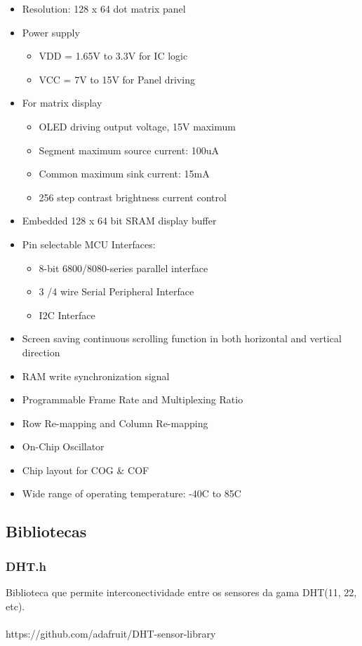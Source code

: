 \documentclass[12pt,a4paper,portrait]{article}
\begin{document}
			\begin{itemize}
				\item Resolution: 128 x 64 dot matrix panel 
				\item Power supply 
				\begin{itemize}
					\item VDD = 1.65V to 3.3V for IC logic
					\item VCC = 7V to 15V for Panel driving 
				\end{itemize}
				\item For matrix display
				\begin{itemize}
					\item OLED driving output voltage, 15V maximum 
					\item Segment maximum source current: 100uA 
					\item Common maximum sink current: 15mA 
					\item 256 step contrast brightness current control 
				\end{itemize}
				\item Embedded 128 x 64 bit SRAM display buffer 
				\item Pin selectable MCU Interfaces: 
				\begin{itemize}
					\item 8-bit 6800/8080-series parallel interface 
					\item 3 /4 wire Serial Peripheral Interface 
					\item I2C Interface  
				\end{itemize}
				\item Screen saving continuous scrolling function in both horizontal and vertical direction 
				\item RAM write synchronization signal 
				\item Programmable Frame Rate and Multiplexing Ratio 
				\item Row Re-mapping and Column Re-mapping 
				\item On-Chip Oscillator 
				\item Chip layout for COG \& COF 
				\item Wide range of operating temperature: -40\textdegree C to 85\textdegree C
			\end{itemize}
			\newpage
		\subsection{Bibliotecas}
			\subsubsection{DHT.h}
			Biblioteca que permite interconectividade entre os sensores da gama DHT(11, 22, etc).\\\\
			https://github.com/adafruit/DHT-sensor-library\\
			\cite{adafruitdht}
\end{document}

